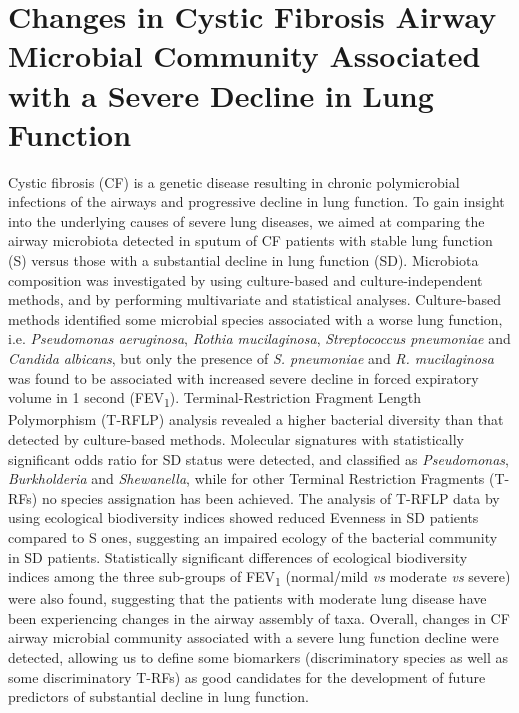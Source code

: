 \section{Changes in Cystic Fibrosis Airway Microbial Community Associated with a Severe Decline in Lung Function}
Cystic fibrosis (CF) is a genetic disease resulting in chronic polymicrobial infections of the airways and progressive decline in lung function. To gain insight into the underlying causes of severe lung diseases, we aimed at comparing the airway microbiota detected in sputum of CF patients with stable lung function (S) versus those with a substantial decline in lung function (SD). Microbiota composition was investigated by using culture-based and culture-independent methods, and by performing multivariate and statistical analyses. Culture-based methods identified some microbial species associated with a worse lung function, i.e. \textit{Pseudomonas aeruginosa}, \textit{Rothia mucilaginosa}, \textit{Streptococcus pneumoniae }and \textit{Candida albicans}, but only the presence of \textit{S. pneumoniae }and \textit{R. mucilaginosa }was found to be associated with increased severe decline in forced expiratory volume in 1 second (FEV\textsubscript{1}). Terminal-Restriction Fragment Length Polymorphism (T-RFLP) analysis revealed a higher bacterial diversity than that detected by culture-based methods. Molecular signatures with statistically significant odds ratio for SD status were detected, and classified as \textit{Pseudomonas}, \textit{Burkholderia} and \textit{Shewanella}, while for other Terminal Restriction Fragments (T-RFs) no species assignation has been achieved. The analysis of T-RFLP data by using ecological biodiversity indices showed reduced Evenness in SD patients compared to S ones, suggesting an impaired ecology of the bacterial community in SD patients. Statistically significant differences of ecological biodiversity indices among the three sub-groups of FEV\textsubscript{1 }(normal/mild \textit{vs} moderate \textit{vs} severe) were also found, suggesting that the patients with moderate lung disease have been experiencing changes in the airway assembly of taxa. Overall, changes in CF airway microbial community associated with a severe lung function decline were detected, allowing us to define some biomarkers (discriminatory species as well as some discriminatory T-RFs) as good candidates for the development of future predictors of substantial decline in lung function.\\

